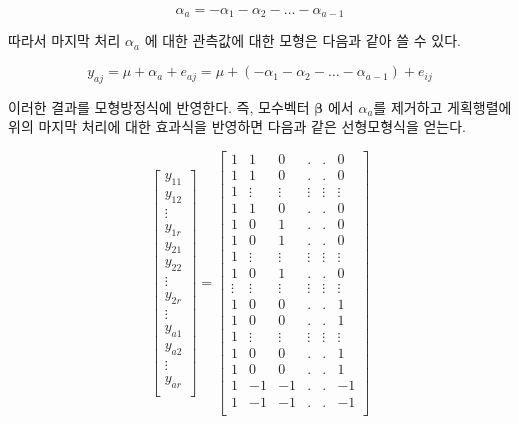 \documentclass[
]{book}
\theoremstyle{definition}
\theoremstyle{definition}
\theoremstyle{definition}
\theoremstyle{definition}
\theoremstyle{remark}
\begin{document}
\[ \alpha_a = -\alpha_1 - \alpha_2 - \dots - \alpha_{a-1} \]

따라서 마지막 처리 \(\alpha_a\) 에 대한 관측값에 대한 모형은 다음과 같아 쓸 수 있다.

\[ y_{aj} = \mu + \alpha_a + e_{aj} = \mu +( -\alpha_1 - \alpha_2 - \dots - \alpha_{a-1}) + e_{ij} \]

이러한 결과를 모형방정식에 반영한다. 즉, 모수벡터 \(\bm \beta\) 에서 \(\alpha_a\)를 제거하고 게획행렬에 위의 마지막 처리에 대한 효과식을 반영하면 다음과 같은 선형모형식을 얻는다.

\begin{equation}
\begin{bmatrix}
y_{11} \\
y_{12} \\
\vdots \\
y_{1r} \\
y_{21} \\
y_{22} \\
\vdots \\
y_{2r} \\
\vdots \\
y_{a1} \\
y_{a2} \\
\vdots \\
y_{ar} \\
\end{bmatrix} 
 =
\begin{bmatrix}
1 & 1 & 0 & . & . & 0 \\
1 & 1 & 0 & . & . & 0 \\
1 & \vdots & \vdots & \vdots & \vdots & \vdots \\
1 & 1 & 0 & . & . & 0 \\
1 & 0 & 1 & . & . & 0 \\
1 & 0 & 1 & . & . & 0 \\
1 & \vdots & \vdots & \vdots & \vdots & \vdots \\
1 & 0 & 1 & . & . & 0 \\
\vdots & \vdots & \vdots & \vdots & \vdots & \vdots \\
1 & 0 & 0 & . & . & 1 \\
1 & 0 & 0 & . & . & 1 \\
1 & \vdots & \vdots & \vdots & \vdots & \vdots \\
1 & 0 & 0 & . & . & 1 \\
1 & 0 & 0 & . & . & 1 \\
1 & -1 & -1 & . & . & -1 \\
1 & -1 & -1 & . & . & -1 \\

\end{bmatrix}
\end{equation}
\end{document}
